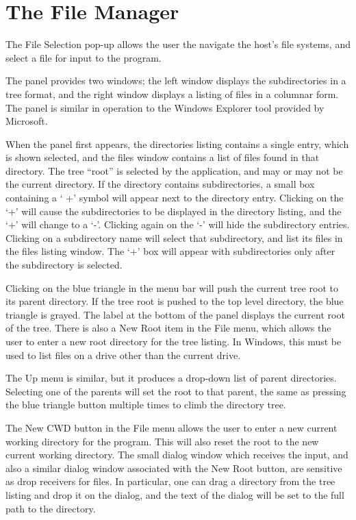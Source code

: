 \section{The File Manager}
\label{filemgr}


The File Selection pop-up allows the user the navigate the host's
file systems, and select a file for input to the program.

The panel provides two windows; the left window displays the
subdirectories in a tree format, and the right window displays a
listing of files in a columnar form.  The panel is similar in
operation to the Windows Explorer tool provided by Microsoft.

When the panel first appears, the directories listing contains a
single entry, which is shown selected, and the files window contains a
list of files found in that directory.  The tree ``root'' is selected
by the application, and may or may not be the current directory.  If
the directory contains subdirectories, a small box containing a `{\vt
+}' symbol will appear next to the directory entry.  Clicking on the
`{\vt +}' will cause the subdirectories to be displayed in the
directory listing, and the `{\vt +}' will change to a `{\vt -}'. 
Clicking again on the `{\vt -}' will hide the subdirectory entries. 
Clicking on a subdirectory name will select that subdirectory, and
list its files in the files listing window.  The `{\vt +}' box will
appear with subdirectories only after the subdirectory is selected.

Clicking on the blue triangle in the menu bar will push the current
tree root to its parent directory.  If the tree root is pushed to the
top level directory, the blue triangle is grayed.  The label at the
bottom of the panel displays the current root of the tree.  There is
also a {\cb New Root} item in the {\cb File} menu, which allows the
user to enter a new root directory for the tree listing.  In Windows,
this must be used to list files on a drive other than the current
drive.

The {\cb Up} menu is similar, but it produces a drop-down list of
parent directories.  Selecting one of the parents will set the root to
that parent, the same as pressing the blue triangle button multiple
times to climb the directory tree.

The {\cb New CWD} button in the {\cb File} menu allows the user to
enter a new current working directory for the program.  This will also
reset the root to the new current working directory.  The small dialog
window which receives the input, and also a similar dialog window
associated with the {\cb New Root} button, are sensitive as drop
receivers for files.  In particular, one can drag a directory from the
tree listing and drop it on the dialog, and the text of the dialog
will be set to the full path to the directory.

